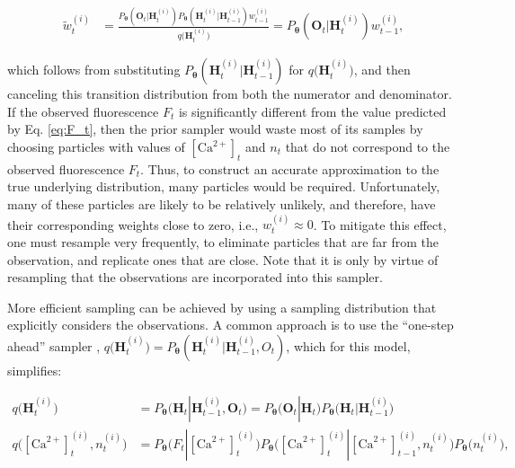 \documentclass[12pt]{article}
\providecommand{\ve}[1]{\boldsymbol{#1}}
\providecommand{\ve}[1]{\boldsymbol{#1}}
\newcommand{\thetn}{\ve{\theta}}
\newcommand{\p}{P_{\thetn}}
\newcommand{\q}{q\big(\ve{H}_t^{(i)}\big)}
\newcommand{\Ca}{[\text{Ca}^{2+}]}
\begin{document}
\begin{align} \label{eq:prior_weights}
\widetilde{w}_t^{(i)} &= \frac{\p(\ve{O}_t | \ve{H}_t^{(i)})  \p(\ve{H}_t^{(i)} | \ve{H}_{t-1}^{(i)}) w_{t-1}^{(i)}}{\q} %
=\p(\ve{O}_t | \ve{H}_t^{(i)}) w_{t-1}^{(i)},
\end{align}

\noindent which follows from substituting $\p(\ve{H}_t^{(i)} | \ve{H}_{t-1}^{(i)})$ for $\q$, and then canceling this transition distribution from both the numerator and denominator. If the observed fluorescence $F_t$ is significantly different from the value predicted by Eq. \ref{eq:F_t}, then the prior sampler would waste most of its samples by choosing particles with values of $\Ca_t$ and $n_t$ that do not correspond to the observed fluorescence $F_t$.  Thus, to construct an accurate approximation to the true underlying distribution, many particles would be required. Unfortunately, many of these particles are likely to be relatively unlikely, and therefore, have their corresponding weights close to zero, i.e., $w_t^{(i)} \approx 0$.  To mitigate this effect, one must resample very frequently, to eliminate particles that are far from the observation, and replicate ones that are close. Note that it is only by virtue of resampling that the observations are incorporated into this sampler.

More efficient sampling can be achieved by using a sampling distribution that explicitly considers the observations.  A common approach is to use the ``one-step ahead'' sampler \cite{DoucetGordon01}, $\q = \p(\ve{H}_t^{(i)} | \ve{H}_{t-1}^{(i)}, O_t)$, which for this model, simplifies:

\begin{subequations}
\begin{align}
\q &= \p\big(\ve{H}_t | \ve{H}_{t-1}^{(i)}, \ve{O}_t\big) %
= \p\big(\ve{O}_t | \ve{H}_t\big) \p\big(\ve{H}_t | \ve{H}_{t-1}^{(i)}\big) \nonumber \\  \label{eq:q1}
q\big(\Ca_t^{(i)}, n_t^{(i)}\big) &=  \p\big(F_t | \Ca_t^{(i)}\big)  \p\big(\Ca_t^{(i)} | \Ca_{t-1}^{(i)}, n_t^{(i)}\big) \p\big(n_t^{(i)}\big),
\end{align}
\end{subequations}

%
\end{document}
